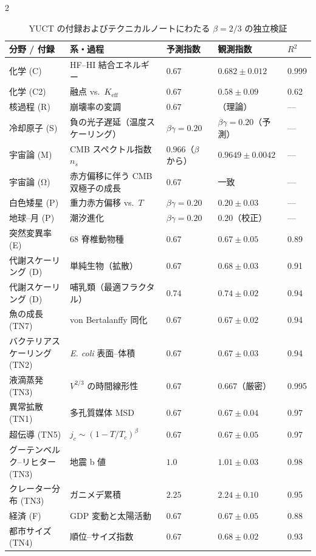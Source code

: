 \documentclass[11pt,a4paper]{article}
\newcommand{\betaf}{\beta}
\begin{document}
\begin{multicols}{2}
		\begin{table}[htbp]
			\centering
			\caption{YUCT の付録およびテクニカルノートにわたる \(\betaf = 2/3\) の独立検証}
			\label{tab:full}
			\footnotesize
			\begin{tabular}{p{3.5cm}p{5.0cm}p{2.1cm}p{3.5cm}p{1.4cm}}
				\toprule
				\textbf{分野 / 付録} & \textbf{系・過程} & \textbf{予測指数} & \textbf{観測指数} & \(R^2\) \\
				\midrule
				化学 (C) & HF--HI 結合エネルギー & \(0.67\) & \(0.682 \pm 0.012\) & 0.999 \\
				化学 (C2) & 融点 vs.\ \(K_{\mathrm{eff}}\) & \(0.67\) & \(0.58 \pm 0.09\) & 0.62 \\
				核過程 (R) & 崩壊率の変調 & \(0.67\) & （理論） & — \\
				冷却原子 (S) & 負の光子遅延（温度スケーリング） & \(\beta\gamma = 0.20\) & \(\beta\gamma = 0.20\)（予測） & — \\
				宇宙論 (M) & CMB スペクトル指数 \(n_s\) & \(0.966\)（\(\beta\) から） & \(0.9649 \pm 0.0042\) & — \\
				宇宙論 (Ω) & 赤方偏移に伴う CMB 双極子の成長 & \(0.67\) & 一致 & — \\
				白色矮星 (P) & 重力赤方偏移 vs.\ \(T\) & \(\beta\gamma = 0.20\) & \(0.20 \pm 0.03\) & — \\
				地球--月 (P) & 潮汐進化 & \(\beta\gamma = 0.20\) & \(0.20\)（校正） & — \\
				突然変異率 (E) & 68 脊椎動物種 & \(0.67\) & \(0.67 \pm 0.05\) & 0.89 \\
				代謝スケーリング (D) & 単純生物（拡散） & \(0.67\) & \(0.68 \pm 0.03\) & 0.91 \\
				代謝スケーリング (D) & 哺乳類（最適フラクタル） & \(0.74\) & \(0.74 \pm 0.02\) & 0.94 \\
				魚の成長 (TN7) & von Bertalanffy 同化 & \(0.67\) & \(0.67 \pm 0.02\) & 0.94 \\
				バクテリアスケーリング (TN2) & \emph{E. coli} 表面--体積 & \(0.67\) & \(0.67 \pm 0.03\) & 0.94 \\
				液滴蒸発 (TN3) & \(V^{2/3}\) の時間線形性 & \(0.67\) & \(0.667\)（厳密） & 0.995 \\
				異常拡散 (TN1) & 多孔質媒体 MSD & \(0.67\) & \(0.67 \pm 0.04\) & 0.97 \\
				超伝導 (TN5) & \(j_c \sim (1-T/T_c)^{\beta}\) & \(0.67\) & \(0.67 \pm 0.05\) & 0.97 \\
				グーテンベルク--リヒター (TN3) & 地震 b 値 & \(1.0\) & \(1.01 \pm 0.03\) & 0.98 \\
				クレーター分布 (TN3) & ガニメデ累積 & \(2.25\) & \(2.24 \pm 0.10\) & 0.95 \\
				経済 (F) & GDP 変動と太陽活動 & \(0.67\) & \(0.67 \pm 0.05\) & 0.88 \\
				都市サイズ (TN4) & 順位--サイズ指数 & \(0.67\) & \(0.68 \pm 0.02\) & 0.93 \\
				\bottomrule
			\end{tabular}
		\end{table}
		

\end{multicols}
\end{document}
